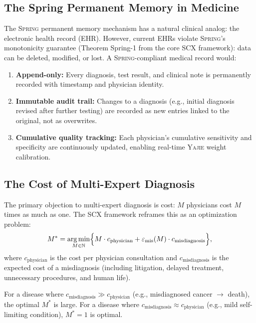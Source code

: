 \documentclass[11pt,a4paper]{article}
\theoremstyle{definition}
\newcommand{\Yajie}{\textsc{Yajie}}
\newcommand{\Spring}{\textsc{Spring}}
\newcommand{\SCX}{\textsc{SCX}}
\DeclareMathOperator*{\argmin}{arg\,min}
\newcommand{\N}{\mathbb{N}}
\newcommand{\misdiagnosis}{\varepsilon_{\text{mis}}}  %
\begin{document}
\subsection{The Spring Permanent Memory in Medicine}

The \Spring{} permanent memory mechanism has a natural clinical analog:
the electronic health record (EHR). However, current EHRs violate
\Spring{}'s monotonicity guarantee (Theorem Spring-1 from the core \SCX{}
framework): data can be deleted, modified, or lost. A \Spring{}-compliant
medical record would:
\begin{enumerate}[nosep]
    \item \textbf{Append-only:} Every diagnosis, test result, and clinical
    note is permanently recorded with timestamp and physician identity.
    \item \textbf{Immutable audit trail:} Changes to a diagnosis (e.g.,
    initial diagnosis revised after further testing) are recorded as new
    entries linked to the original, not as overwrites.
    \item \textbf{Cumulative quality tracking:} Each physician's cumulative
    sensitivity and specificity are continuously updated, enabling real-time
    \Yajie{} weight calibration.
\end{enumerate}

\subsection{The Cost of Multi-Expert Diagnosis}

The primary objection to multi-expert diagnosis is cost: $M$ physicians
cost $M$ times as much as one. The \SCX{} framework reframes this as an
optimization problem:
\begin{equation}
    M^* = \argmin_{M \in \N} \Bigl\{M \cdot c_{\text{physician}} + \misdiagnosis(M) \cdot c_{\text{misdiagnosis}}\Bigr\},
\end{equation}
where $c_{\text{physician}}$ is the cost per physician consultation and
$c_{\text{misdiagnosis}}$ is the expected cost of a misdiagnosis (including
litigation, delayed treatment, unnecessary procedures, and human life).

For a disease where $c_{\text{misdiagnosis}} \gg c_{\text{physician}}$
(e.g., misdiagnosed cancer $\to$ death), the optimal $M^*$ is large.
For a disease where $c_{\text{misdiagnosis}} \approx c_{\text{physician}}$
(e.g., mild self-limiting condition), $M^* = 1$ is optimal.
\end{document}
